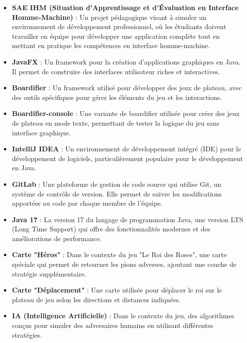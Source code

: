 \begin{itemize}
    \label{sae-ihm}
    \item \textbf{SAE IHM (Situation d'Apprentissage et d'Évaluation en Interface Homme-Machine)} : Un projet pédagogique visant à simuler un environnement de développement professionnel, où les étudiants doivent travailler en équipe pour développer une application complète tout en mettant en pratique les compétences en interface homme-machine.

    \item \textbf{JavaFX} : Un framework pour la création d'applications graphiques en Java. Il permet de construire des interfaces utilisateur riches et interactives.

    \item \textbf{Boardifier} : Un framework utilisé pour développer des jeux de plateau, avec des outils spécifiques pour gérer les éléments du jeu et les interactions.

    \item \textbf{Boardifier-console} : Une variante de boardifier utilisée pour créer des jeux de plateau en mode texte, permettant de tester la logique du jeu sans interface graphique.

    \item \textbf{IntelliJ IDEA} : Un environnement de développement intégré (IDE) pour le développement de logiciels, particulièrement populaire pour le développement en Java.

    \item \textbf{GitLab} : Une plateforme de gestion de code source qui utilise Git, un système de contrôle de version. Elle permet de suivre les modifications apportées au code par chaque membre de l'équipe.

    \item \textbf{Java 17} : La version 17 du langage de programmation Java, une version LTS (Long Time Support) qui offre des fonctionnalités modernes et des améliorations de performance.

    \item \textbf{Carte "Héros"} : Dans le contexte du jeu "Le Roi des Roses", une carte spéciale qui permet de retourner les pions adverses, ajoutant une couche de stratégie supplémentaire.

    \item \textbf{Carte "Déplacement"} : Une carte utilisée pour déplacer le roi sur le plateau de jeu selon les directions et distances indiquées.

    \item \textbf{IA (Intelligence Artificielle)} : Dans le contexte du jeu, des algorithmes conçus pour simuler des adversaires humains en utilisant différentes stratégies.


\end{itemize}
